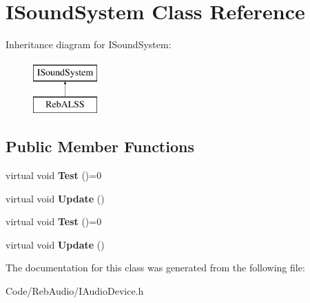 \hypertarget{class_i_sound_system}{}\section{I\+Sound\+System Class Reference}
\label{class_i_sound_system}
Inheritance diagram for I\+Sound\+System\+:\begin{figure}[H]
\begin{center}
\leavevmode
\includegraphics[height=2.000000cm]{class_i_sound_system}
\end{center}
\end{figure}
\subsection*{Public Member Functions}
\begin{DoxyCompactItemize}
\item 
virtual void {\bfseries Test} ()=0\hypertarget{class_i_sound_system_aa04e598b239727c228e8a1b42472c7f8}{}\label{class_i_sound_system_aa04e598b239727c228e8a1b42472c7f8}

\item 
virtual void {\bfseries Update} ()\hypertarget{class_i_sound_system_a2ea341684112c605f9ba72c195a46f51}{}\label{class_i_sound_system_a2ea341684112c605f9ba72c195a46f51}

\item 
virtual void {\bfseries Test} ()=0\hypertarget{class_i_sound_system_aa04e598b239727c228e8a1b42472c7f8}{}\label{class_i_sound_system_aa04e598b239727c228e8a1b42472c7f8}

\item 
virtual void {\bfseries Update} ()\hypertarget{class_i_sound_system_a2ea341684112c605f9ba72c195a46f51}{}\label{class_i_sound_system_a2ea341684112c605f9ba72c195a46f51}

\end{DoxyCompactItemize}


The documentation for this class was generated from the following file\+:\begin{DoxyCompactItemize}
\item 
Code/\+Reb\+Audio/I\+Audio\+Device.\+h\end{DoxyCompactItemize}
